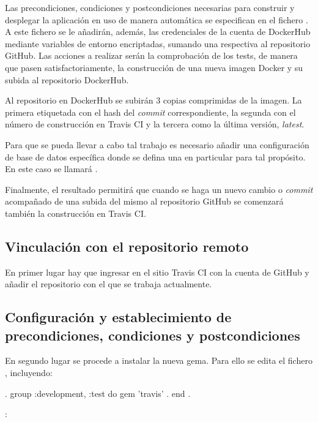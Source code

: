 Las precondiciones, condiciones y postcondiciones necesarias para construir y desplegar la aplicación en uso de manera automática se especifican en el fichero . A este fichero se le añadirán, además, las credenciales de la cuenta de DockerHub mediante variables de entorno encriptadas, sumando una respectiva al repositorio GitHub. Las acciones a realizar serán la comprobación de los tests, de manera que pasen satisfactoriamente, la construcción de una nueva imagen Docker y su subida al repositorio DockerHub.

Al repositorio en DockerHub se subirán 3 copias comprimidas de la imagen. La primera etiquetada con el hash del \textit{commit} correspondiente, la segunda con el número de construcción en Travis CI y la tercera como la última versión, \textit{latest}.

Para que se pueda llevar a cabo tal trabajo es necesario añadir una configuración de base de datos específica donde se defina una en particular para tal propósito. En este caso se llamará .

Finalmente, el resultado permitirá que cuando se haga un nuevo cambio o \textit{commit} acompañado de una subida del mismo al repositorio GitHub se comenzará también la construcción en Travis CI.

\subsection{Vinculación con el repositorio remoto}

En primer lugar hay que ingresar en el sitio Travis CI con la cuenta de GitHub y añadir el repositorio con el que se trabaja actualmente.

\subsection{Configuración y establecimiento de precondiciones, condiciones y postcondiciones}

En segundo lugar se procede a instalar la nueva gema. Para ello se edita el fichero , incluyendo:

\begin{codelisting}
\label{code:addtravis}
\begin{code}
.
group :development, :test do
  gem 'travis'
.
end
.
\end{code}
\end{codelisting}: 

